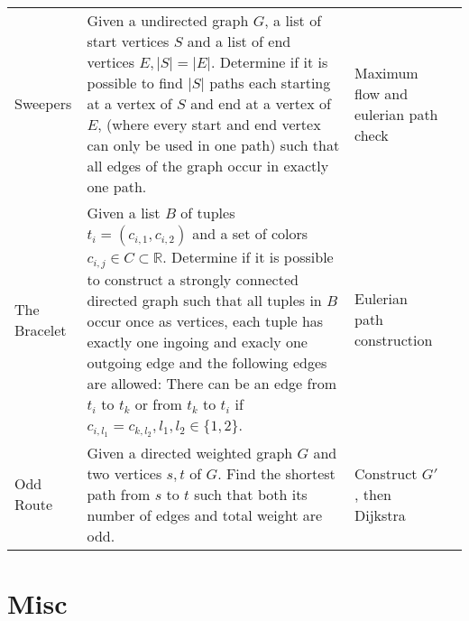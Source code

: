 \documentclass[a4paper, 10pt]{article}
\let\stdsection\section
\renewcommand\section{\newpage\stdsection}
\begin{document}
\begin{longtable}{ L{2cm} L{8cm} L{4cm} r}
        Sweepers 
        & Given a undirected graph $G$, a list of start vertices $S$ and a list of end vertices $E, |S|=|E|$.
            Determine if it is possible to find $|S|$ paths each starting at a vertex of $S$ and end at a vertex of $E$, 
            (where every start and end vertex can only be used in one path) such that all edges of the graph occur in exactly one path.   
        & Maximum flow and eulerian path check &  \pageref{sec:sweepers} \\

        The Bracelet 
        & Given a list $B$ of tuples $t_i = (c_{i,1}, c_{i,2})$ and a set of colors $c_{i,j}\in C\subset \mathbb{R}$.
            Determine if it is possible to construct a strongly connected directed graph such that all tuples in $B$ occur once as vertices,
            each tuple has exactly one ingoing and exacly one outgoing edge and the following edges are allowed: 
            There can be an edge from $t_i$ to $t_k$ or from $t_k$ to $t_i$ if $c_{i,l_1} = c_{k,l_2}, l_1,l_2\in\{1,2\}$.   
        & Eulerian path construction &  \pageref{sec:the_bracelet} \\

        Odd Route
        & Given a directed weighted graph $G$ and two vertices $s,t$ of $G$. Find the shortest path from 
            $s$ to $t$ such that both its number of edges and total weight are odd.
        & Construct $G'$, then Dijkstra &  \pageref{sec:odd_route} \\




    \end{longtable}    


    \section{Misc}
\end{document}
